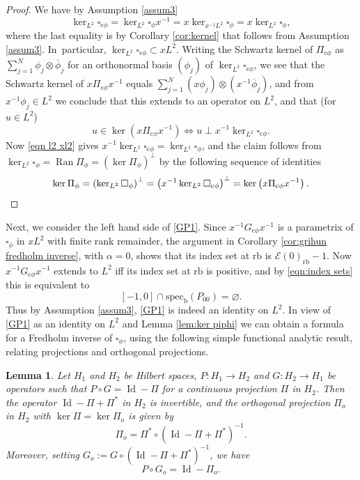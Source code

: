 \documentclass[JEP,XML,SOM,Unicode,NoFloatCountersInSection,published]{cedram}
\newcommand{\cphi}{{\mathrm{c}\phi}}
\theoremstyle{plain}
\newtheorem{Lemma}[Th]{Lemma}
\theoremstyle{definition}
\newcommand\calE{{\mathcal E}}
\newcommand{\rf}{{\mathrm{rb}}}
\newcommand{\bb}{{\mathrm{b}}}
\newcommand{\specb}{\mathrm{spec}_\bb}
\DeclareMathOperator{\Id}{Id}
\DeclareMathOperator\Ran{Ran}
\begin{document}
\begin{proof}
We have by Assumption \ref{assum3}
\begin{equation}
\label{eqn l2 xl2}
\ker_{L^2} \square_{\cphi} = \ker_{L^2} \square_\phi x^{-1} = x\ker_{x^{-1}L^2} \square_\phi = x\ker_{L^2}\square_\phi,
\end{equation}
where the last equality is by Corollary \ref{cor:kernel} that follows from Assumption \ref{assum3}.
In~particular, $\ker_{L^2} \square_{\cphi}\subset xL^2$. Writing the Schwartz kernel of $\Pi_{\cphi}$ as $\sum_{j=1}^N \phi_j\otimes\overline\phi_j$ for an orthonormal basis $(\phi_j)$ of $\ker_{L^2} \square_{\cphi}$, we see that the Schwartz kernel of $x\Pi_{\cphi}x^{-1}$ equals $\sum_{j=1}^N (x\phi_j)\otimes(x^{-1}\overline\phi_j)$, and from $x^{-1}\phi_j\in L^2$ we conclude that this extends to an operator on $L^2$, and that (for $u \in L^2$)
\[
u\in \ker \left(x \Pi_{\cphi} x^{-1} \right) \iff u \perp x^{-1}\ker_{L^2} \square_{\cphi}.
\]
Now \eqref{eqn l2 xl2} gives $ x^{-1}\ker_{L^2} \square_{\cphi}=\ker_{L^2}\square_\phi$, and the claim follows from $\ker_{L^2}\square_\phi = \Ran\Pi_\phi=(\ker\Pi_\phi)^\perp$ by the following sequence of identities
\[
\ker \Pi_\phi = \left(\ker_{L^2} \square_\phi \right)^\perp
= \left(x^{-1} \ker_{L^2} \square_{\cphi} \right)^\perp = \ker \left(x \Pi_{\cphi} x^{-1}\right).\qedhere
\]
\end{proof}
Next, we consider the left hand side of \eqref{GP1}.
Since $x^{-1}G_{\cphi}x^{-1}$ is a parametrix of $\square_\phi$ in $xL^2$ with finite rank remainder, the argument in Corollary \ref{cor:grihun fredholm inverse}, with $\alpha=0$, shows that its index set at $\rf$ is $\calE(0)_\rf - 1$. Now $x^{-1}G_{\cphi}x^{-1}$ extends to $L^2$ iff its index set at $\rf$ is positive, and by \eqref{eqn:index sets} this is equivalent to
\begin{equation}
\label{eqn:-1,0 condition}
[-1,0]\cap \specb(P_{00})=\varnothing.
\end{equation}
Thus by Assumption \ref{assum3}, \eqref{GP1} is indeed an identity on $L^2$.
In view of \eqref{GP1} as an identity on $L^2$ and Lemma \ref{lem:ker piphi} we can obtain a formula for a Fredholm inverse of
$\square_\phi$, using the following simple functional analytic result, relating projections and orthogonal projections.

\begin{Lemma}\label{funkana}
Let $H_1$ and $H_2$ be Hilbert spaces, $P:H_1\to H_2$ and $G:H_2 \to H_1$ be operators
such that $P\circ G=\Id - \Pi$ for a continuous projection $\Pi$ in $H_2$. Then the operator $\Id - \Pi + \Pi^*$ in $H_2$ is invertible, and the
orthogonal
projection $\Pi_o$ in $H_2$ with $\ker \Pi = \ker \Pi_o$ is given by
\begin{equation}\label{Po}
\Pi_o = \Pi^* \circ (\Id - \Pi + \Pi^*)^{-1}.
\end{equation}
Moreover, setting $G_o:= G \circ (\Id - \Pi + \Pi^*)^{-1}$, we have
\begin{equation}\label{Go}
P\circ G_o=\Id - \Pi_o.
\end{equation}
\end{Lemma}
\end{document}
